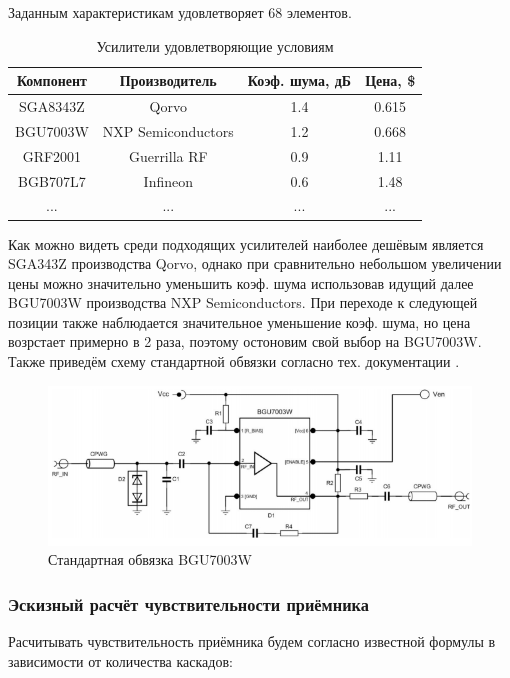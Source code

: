 \documentclass[utf8x, 14pt, oneside, a4paper]{article}
\begin{document}
				\vspace{\baselineskip}
				
				Заданным характеристикам удовлетворяет 68 элементов.
				
				\begin{table}[H]	
					\centering
					\begin{tabular}{|c|c|c|c|}
						\hline
						Компонент & Производитель & Коэф. шума, дБ & Цена, \$ \\
						\hline
						SGA8343Z & Qorvo & 1.4 &  0.615 \\
						\hline
						BGU7003W & NXP Semiconductors & 1.2 & 0.668 \\
						\hline
						GRF2001 & Guerrilla RF & 0.9 & 1.11 \\
						\hline
						BGB707L7 & Infineon & 0.6 & 1.48 \\
						\hline
						... & ... & ... & ... \\
						\hline
					\end{tabular}
					\caption{Усилители удовлетворяющие условиям}
					\label{table:Amp0}
				\end{table}
				
				Как можно видеть среди подходящих усилителей наиболее дешёвым является SGA343Z производства Qorvo, однако при сравнительно небольшом увеличении цены можно значительно уменьшить коэф. шума использовав идущий далее BGU7003W производства NXP Semiconductors. При переходе к следующей позиции также наблюдается значительное уменьшение коэф. шума, но цена возрстает примерно в 2 раза, поэтому остоновим свой выбор на BGU7003W. Также приведём схему стандартной обвязки согласно тех. документации \cite{bib:docs:BGU7003W}.
				
				\begin{figure}[H]
					\centering
					\includegraphics[width=0.7\linewidth]{"Рисунки/Доки/BGU7003W"}
					\caption{Стандартная обвязка BGU7003W}
					\label{fig:doc:BGU7003W}
				\end{figure}
			
			\subsubsection{Эскизный расчёт чувствительности приёмника}
				Расчитывать чувствительность приёмника будем согласно известной формулы в зависимости от количества каскадов:
				
\end{document}
